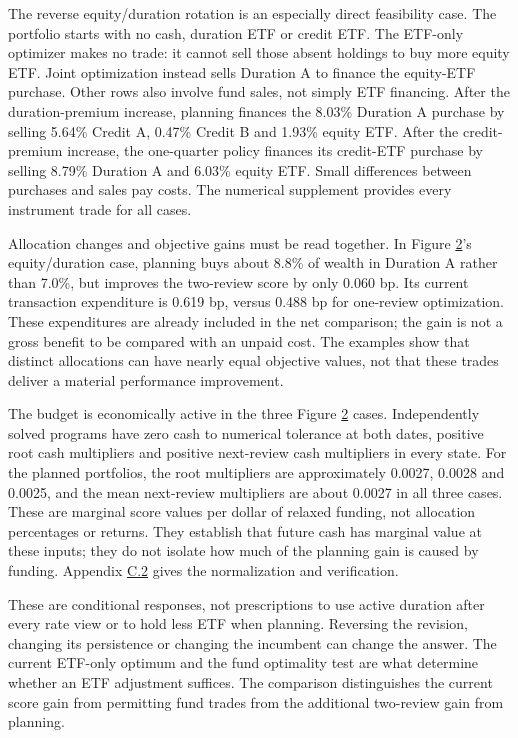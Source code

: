 \documentclass[11pt]{article}
\begin{document}
The reverse equity/duration rotation is an especially direct feasibility case. The portfolio starts with no cash, duration ETF or credit ETF. The ETF-only optimizer makes no trade: it cannot sell those absent holdings to buy more equity ETF. Joint optimization instead sells Duration A to finance the equity-ETF purchase. Other rows also involve fund sales, not simply ETF financing. After the duration-premium increase, planning finances the 8.03\% Duration A purchase by selling 5.64\% Credit A, 0.47\% Credit B and 1.93\% equity ETF. After the credit-premium increase, the one-quarter policy finances its credit-ETF purchase by selling 8.79\% Duration A and 6.03\% equity ETF. Small differences between purchases and sales pay costs. The numerical supplement provides every instrument trade for all cases.

Allocation changes and objective gains must be read together. In Figure \hyperref[fig:2]{2}'s equity/duration case, planning buys about 8.8\% of wealth in Duration A rather than 7.0\%, but improves the two-review score by only 0.060 bp. Its current transaction expenditure is 0.619 bp, versus 0.488 bp for one-review optimization. These expenditures are already included in the net comparison; the gain is not a gross benefit to be compared with an unpaid cost. The examples show that distinct allocations can have nearly equal objective values, not that these trades deliver a material performance improvement.

The budget is economically active in the three Figure \hyperref[fig:2]{2} cases. Independently solved programs have zero cash to numerical tolerance at both dates, positive root cash multipliers and positive next-review cash multipliers in every state. For the planned portfolios, the root multipliers are approximately 0.0027, 0.0028 and 0.0025, and the mean next-review multipliers are about 0.0027 in all three cases. These are marginal score values per dollar of relaxed funding, not allocation percentages or returns. They establish that future cash has marginal value at these inputs; they do not isolate how much of the planning gain is caused by funding. Appendix \hyperref[sec:C.2]{C.2} gives the normalization and verification.

These are conditional responses, not prescriptions to use active duration after every rate view or to hold less ETF when planning. Reversing the revision, changing its persistence or changing the incumbent can change the answer. The current ETF-only optimum and the fund optimality test are what determine whether an ETF adjustment suffices. The comparison distinguishes the current score gain from permitting fund trades from the additional two-review gain from planning.
\end{document}
